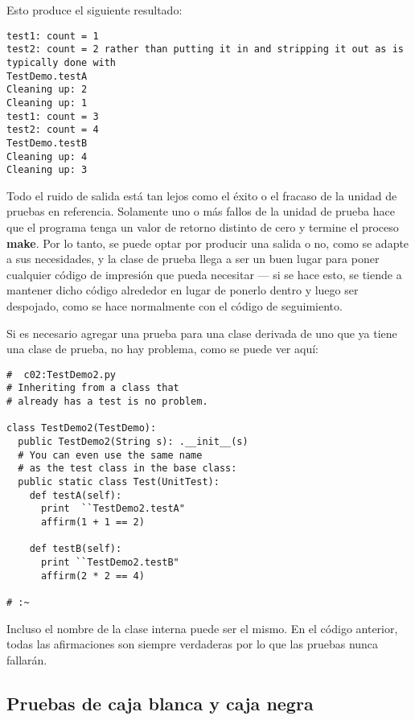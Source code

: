 Esto produce el siguiente resultado: \newline

\begin{lstlisting}
test1: count = 1 
test2: count = 2 rather than putting it in and stripping it out as is typically done with 
TestDemo.testA 
Cleaning up: 2 
Cleaning up: 1 
test1: count = 3 
test2: count = 4 
TestDemo.testB 
Cleaning up: 4 
Cleaning up: 3 
\end{lstlisting}

Todo el ruido de salida está tan lejos como el éxito o el fracaso de la unidad de pruebas en referencia. Solamente uno o más fallos de la unidad de prueba hace que el programa tenga un valor de retorno distinto de cero y termine el proceso \textbf{make}. Por lo tanto, se puede optar por producir una salida o no, como se adapte a sus necesidades, y la clase de prueba llega a ser un buen lugar para poner cualquier código de impresión que pueda necesitar — si se hace esto, se tiende a mantener dicho código alrededor en lugar de ponerlo dentro y luego ser despojado, como se hace normalmente con el código de seguimiento.   \newline

Si es necesario agregar una prueba para una clase derivada de uno que ya tiene una clase de prueba, no hay problema, como se puede ver aquí:     \newline

\begin{lstlisting}
#  c02:TestDemo2.py 
# Inheriting from a class that  
# already has a test is no problem. 

class TestDemo2(TestDemo): 
  public TestDemo2(String s): .__init__(s)  
  # You can even use the same name  
  # as the test class in the base class: 
  public static class Test(UnitTest): 
    def testA(self): 
      print  ``TestDemo2.testA"
      affirm(1 + 1 == 2) 
      
    def testB(self): 
      print ``TestDemo2.testB" 
      affirm(2 * 2 == 4) 
      
# :~ 
\end{lstlisting}

Incluso el nombre de la clase interna puede ser el mismo. En el código anterior, todas las afirmaciones son siempre verdaderas por lo que las pruebas nunca fallarán.

\subsection*{Pruebas de caja blanca y caja negra}
\label{subsec:pdcbycn}

